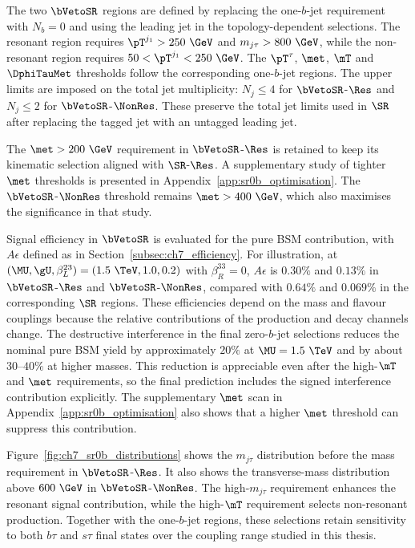 The two $\bVetoSR$ regions are defined by replacing the one-$b$-jet requirement with $N_b=0$ and using the leading jet in the topology-dependent selections.
The resonant region requires $\pT^{j_1}>250~\GeV$ and $m_{j\tau}>800~\GeV$, while the non-resonant region requires $50<\pT^{j_1}<250~\GeV$.
The $\pT^\tau$, $\met$, $\mT$ and $\DphiTauMet$ thresholds follow the corresponding one-$b$-jet regions.
The upper limits are imposed on the total jet multiplicity: $N_j\leq4$ for $\bVetoSR$-$\Res$ and $N_j\leq2$ for $\bVetoSR$-$\NonRes$.
These preserve the total jet limits used in $\SR$ after replacing the tagged jet with an untagged leading jet.

The $\met>200~\GeV$ requirement in $\bVetoSR$-$\Res$ is retained to keep its kinematic selection aligned with $\SR$-$\Res$.
A supplementary study of tighter $\met$ thresholds is presented in Appendix~\ref{app:sr0b_optimisation}.
The $\bVetoSR$-$\NonRes$ threshold remains $\met>400~\GeV$, which also maximises the significance in that study.

Signal efficiency in $\bVetoSR$ is evaluated for the pure BSM contribution, with $A\epsilon$ defined as in Section~\ref{subsec:ch7_efficiency}.
For illustration, at $(\MU,\gU,\beta_L^{23})=(1.5~\TeV,1.0,0.2)$ with $\beta_R^{33}=0$, $A\epsilon$ is $0.30\%$ and $0.13\%$ in $\bVetoSR$-$\Res$ and $\bVetoSR$-$\NonRes$, compared with $0.64\%$ and $0.069\%$ in the corresponding $\SR$ regions.
These efficiencies depend on the mass and flavour couplings because the relative contributions of the production and decay channels change.
The destructive interference in the final zero-$b$-jet selections reduces the nominal pure BSM yield by approximately $20\%$ at $\MU=1.5~\TeV$ and by about $30$--$40\%$ at higher masses.
This reduction is appreciable even after the high-$\mT$ and $\met$ requirements, so the final prediction includes the signed interference contribution explicitly.
The supplementary $\met$ scan in Appendix~\ref{app:sr0b_optimisation} also shows that a higher $\met$ threshold can suppress this contribution.

Figure~\ref{fig:ch7_sr0b_distributions} shows the $m_{j\tau}$ distribution before the mass requirement in $\bVetoSR$-$\Res$.
It also shows the transverse-mass distribution above $600~\GeV$ in $\bVetoSR$-$\NonRes$.
The high-$m_{j\tau}$ requirement enhances the resonant signal contribution, while the high-$\mT$ requirement selects non-resonant production.
Together with the one-$b$-jet regions, these selections retain sensitivity to both $b\tau$ and $s\tau$ final states over the coupling range studied in this thesis.


